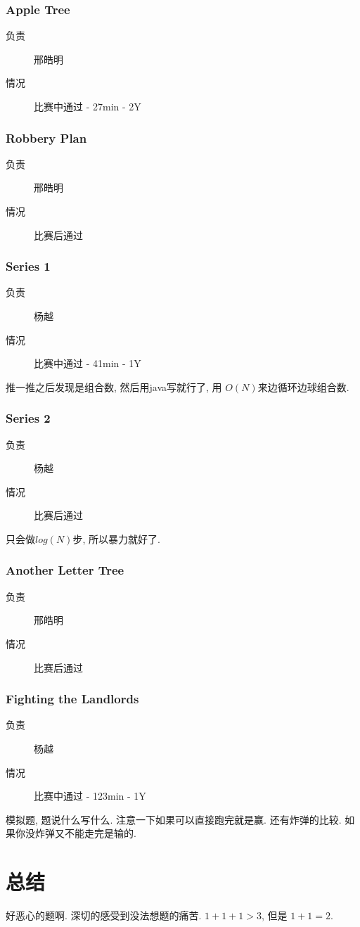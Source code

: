 \documentclass[a4paper, 11pt, nofonts, nocap, fancyhdr]{ctexart}
\newcommand{\problem}[1]{\subsubsection{#1}}
\begin{document}
\problem{Apple Tree}

\begin{description}
\item[负责] 邢皓明
\item[情况] 比赛中通过 - 27min - 2Y
\end{description}



\problem{Robbery Plan}

\begin{description}
\item[负责] 邢皓明
\item[情况] 比赛后通过
\end{description}



\problem{Series 1}

\begin{description}
\item[负责] 杨越
\item[情况] 比赛中通过 - 41min - 1Y
\end{description}

推一推之后发现是组合数, 然后用java写就行了, 用 $O(N)$来边循环边球组合数.

\problem{Series 2}

\begin{description}
\item[负责] 杨越
\item[情况] 比赛后通过
\end{description}

只会做$log(N)$步, 所以暴力就好了.

\problem{Another Letter Tree}

\begin{description}
\item[负责] 邢皓明
\item[情况] 比赛后通过
\end{description}



\problem{Fighting the Landlords}

\begin{description}
\item[负责] 杨越
\item[情况] 比赛中通过 - 123min - 1Y
\end{description}

模拟题, 题说什么写什么. 注意一下如果可以直接跑完就是赢. 还有炸弹的比较. 如果你没炸弹又不能走完是输的.

\section{总结}

好恶心的题啊. 深切的感受到没法想题的痛苦. $1 + 1 + 1 > 3$, 但是 $1+1 = 2$. 
\end{document}
